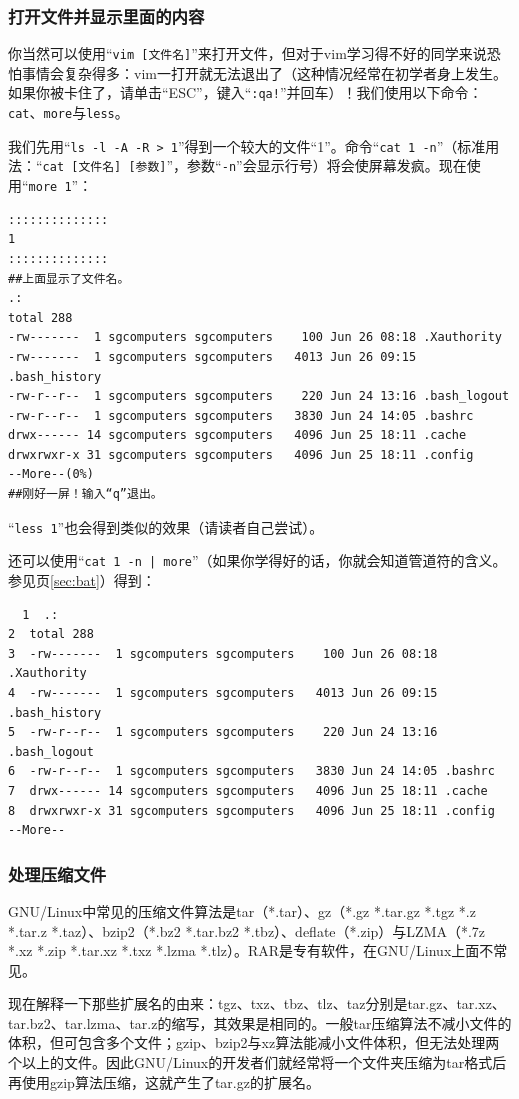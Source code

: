 \subsubsection{打开文件并显示里面的内容}
你当然可以使用“\verb|vim [文件名]|”来打开文件，但对于vim学习得不好的同学来说恐怕事情会复杂得多：vim一打开就无法退出了（这种情况经常在初学者身上发生。如果你被卡住了，请单击“ESC”，键入“\verb|:qa!|”并回车）！我们使用以下命令：\verb|cat|、\verb|more|与\verb|less|。\par
我们先用“\verb|ls -l -A -R > 1|”得到一个较大的文件“1”。命令“\verb|cat 1 -n|”（标准用法：“\verb|cat [文件名] [参数]|”，参数“\verb|-n|”会显示行号）将会使屏幕发疯。现在使用“\verb|more 1|”：
\begin{verbatim}
::::::::::::::
1
::::::::::::::
##上面显示了文件名。
.:
total 288
-rw-------  1 sgcomputers sgcomputers    100 Jun 26 08:18 .Xauthority
-rw-------  1 sgcomputers sgcomputers   4013 Jun 26 09:15 .bash_history
-rw-r--r--  1 sgcomputers sgcomputers    220 Jun 24 13:16 .bash_logout
-rw-r--r--  1 sgcomputers sgcomputers   3830 Jun 24 14:05 .bashrc
drwx------ 14 sgcomputers sgcomputers   4096 Jun 25 18:11 .cache
drwxrwxr-x 31 sgcomputers sgcomputers   4096 Jun 25 18:11 .config
--More--(0%)
##刚好一屏！输入“q”退出。
\end{verbatim} \par
“\verb|less 1|”也会得到类似的效果（请读者自己尝试）。\par
还可以使用“\verb/cat 1 -n | more/”（如果你学得好的话，你就会知道管道符的含义。参见\pageref{sec:bat}页\ref{sec:bat}）得到：
\begin{verbatim}
  1  .:
2  total 288
3  -rw-------  1 sgcomputers sgcomputers    100 Jun 26 08:18 .Xauthority
4  -rw-------  1 sgcomputers sgcomputers   4013 Jun 26 09:15 .bash_history
5  -rw-r--r--  1 sgcomputers sgcomputers    220 Jun 24 13:16 .bash_logout
6  -rw-r--r--  1 sgcomputers sgcomputers   3830 Jun 24 14:05 .bashrc
7  drwx------ 14 sgcomputers sgcomputers   4096 Jun 25 18:11 .cache
8  drwxrwxr-x 31 sgcomputers sgcomputers   4096 Jun 25 18:11 .config
--More--
\end{verbatim}
\subsubsection{处理压缩文件}
GNU/Linux中常见的压缩文件算法是tar（*.tar）、gz（*.gz *.tar.gz *.tgz *.z *.tar.z *.taz）、bzip2（*.bz2 *.tar.bz2 *.tbz）、deflate（*.zip）与LZMA（*.7z *.xz *.zip *.tar.xz *.txz *.lzma *.tlz）。RAR是专有软件，在GNU/Linux上面不常见。\par
现在解释一下那些扩展名的由来：tgz、txz、tbz、tlz、taz分别是tar.gz、tar.xz、tar.bz2、tar.lzma、tar.z的缩写，其效果是相同的。一般tar压缩算法不减小文件的体积，但可包含多个文件；gzip、bzip2与xz算法能减小文件体积，但无法处理两个以上的文件。因此GNU/Linux的开发者们就经常将一个文件夹压缩为tar格式后再使用gzip算法压缩，这就产生了tar.gz的扩展名。\par
